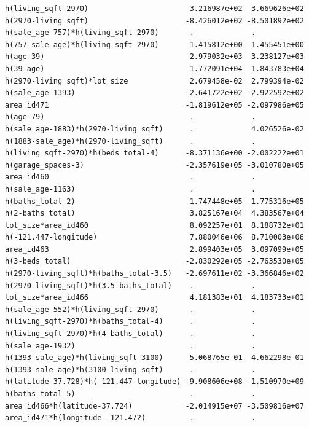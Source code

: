 \documentclass[
]{article}
\begin{document}
\begin{verbatim}
h(living_sqft-2970)                       3.216987e+02  3.669626e+02
h(2970-living_sqft)                      -8.426012e+02 -8.501892e+02
h(sale_age-757)*h(living_sqft-2970)       .             .           
h(757-sale_age)*h(living_sqft-2970)       1.415812e+00  1.455451e+00
h(age-39)                                 2.979032e+03  3.238127e+03
h(39-age)                                 1.772091e+04  1.843783e+04
h(2970-living_sqft)*lot_size              2.679458e-02  2.799394e-02
h(sale_age-1393)                         -2.641722e+02 -2.922592e+02
area_id471                               -1.819612e+05 -2.097986e+05
h(age-79)                                 .             .           
h(sale_age-1883)*h(2970-living_sqft)      .             4.026526e-02
h(1883-sale_age)*h(2970-living_sqft)      .             .           
h(living_sqft-2970)*h(beds_total-4)      -8.371136e+00 -2.002222e+01
h(garage_spaces-3)                       -2.357619e+05 -3.010780e+05
area_id460                                .             .           
h(sale_age-1163)                          .             .           
h(baths_total-2)                          1.747448e+05  1.775316e+05
h(2-baths_total)                          3.825167e+04  4.383567e+04
lot_size*area_id460                       8.092257e+01  8.188732e+01
h(-121.447-longitude)                     7.880046e+06  8.710003e+06
area_id463                                2.899403e+05  3.097099e+05
h(3-beds_total)                          -2.830292e+05 -2.763530e+05
h(2970-living_sqft)*h(baths_total-3.5)   -2.697611e+02 -3.366846e+02
h(2970-living_sqft)*h(3.5-baths_total)    .             .           
lot_size*area_id466                       4.181383e+01  4.183733e+01
h(sale_age-552)*h(living_sqft-2970)       .             .           
h(living_sqft-2970)*h(baths_total-4)      .             .           
h(living_sqft-2970)*h(4-baths_total)      .             .           
h(sale_age-1932)                          .             .           
h(1393-sale_age)*h(living_sqft-3100)      5.068765e-01  4.662298e-01
h(1393-sale_age)*h(3100-living_sqft)      .             .           
h(latitude-37.728)*h(-121.447-longitude) -9.908606e+08 -1.510970e+09
h(baths_total-5)                          .             .           
area_id466*h(latitude-37.724)            -2.014915e+07 -3.509816e+07
area_id471*h(longitude--121.472)          .             .           
                                                                    

\end{verbatim}
\end{document}
